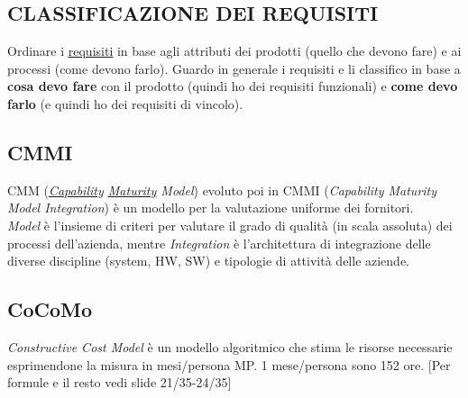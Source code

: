 		\subsection{CLASSIFICAZIONE DEI REQUISITI}  \label{classificazione}
		Ordinare i \underline{\hyperref[requirements]{requisiti}} in base agli attributi dei prodotti (quello che devono fare) e ai processi (come devono farlo). Guardo in generale i requisiti e li classifico in base a \textbf{cosa devo fare} con il prodotto (quindi ho dei requisiti funzionali) e \textbf{come devo farlo} (e quindi ho dei requisiti di vincolo).
		
		\subsection{CMMI}	 \label{cmmi} %
		CMM (\textit{\underline{\hyperref[capability]{Capability}} \underline{\hyperref[maturity]{Maturity}} Model}) evoluto poi in CMMI (\textit{Capability Maturity Model Integration}) è un modello per la valutazione uniforme dei fornitori. \\
		\textit{Model} è l'insieme di criteri per valutare il grado di qualità (in scala assoluta) dei processi dell’azienda, mentre \textit{Integration} è l'architettura di integrazione delle diverse discipline (system, HW, SW) e tipologie di attività delle aziende.
		
		\subsection{CoCoMo}	 \label{cocomo}
		\textit{Constructive Cost Model} è un modello algoritmico che stima le risorse necessarie esprimendone la misura in mesi/persona MP. 1 mese/persona sono 152 ore. [Per formule e il resto vedi slide 21/35-24/35]  
		
